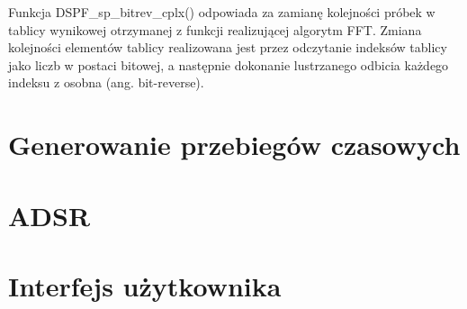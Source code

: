 Funkcja DSPF\_sp\_bitrev\_cplx() odpowiada za zamianę kolejności próbek w tablicy wynikowej otrzymanej z funkcji realizującej algorytm FFT. Zmiana kolejności elementów tablicy realizowana jest przez odczytanie indeksów tablicy jako liczb w postaci bitowej, a następnie dokonanie lustrzanego odbicia każdego indeksu z osobna (ang. bit-reverse).



\section{Generowanie przebiegów czasowych}


\section{ADSR}



\section{Interfejs użytkownika}